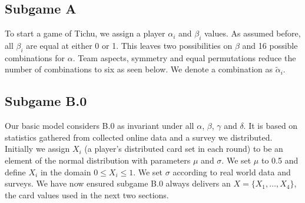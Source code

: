 \subsection{Subgame A}
To start a game of Tichu, we assign a player $\alpha_i$ and $\beta_i$ values. As assumed before, all $\beta_i$ are equal at either 0 or 1. This leaves two possibilities on $\beta$ and 16 possible combinations for $\alpha$. Team aspects, symmetry and equal permutations reduce the number of combinations to six as seen below. We denote a combination as $\tilde{\alpha}_i$.\\
\begin{table}[h]
\end{table}
\begin{table}[h]
\end{table}
\subsection{Subgame B.0}
Our basic model considers B.0 as invariant under all $\alpha$, $\beta$, $\gamma$ and $\delta$. It is based on statistics gathered from collected online data and a survey we distributed. Initially we assign $X_i$ (a player’s distributed card set in each round) to be an element of the normal distribution with parameters $\mu$ and $\sigma$. We set $\mu$ to 0.5 and define $X_i$ in the domain $0\leq X_i \leq 1$. We set $\sigma$ according to real world data and surveys. We have now ensured subgame B.0 always delivers an $X = \{X_1, …, X_4\}$, the card values used in the next two sections.


